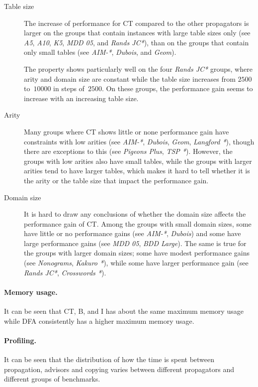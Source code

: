 \documentclass[a4paper,11pt]{article}
\numberwithin{equation}{section}
\begin{document}
\begin{description}
  \item[Table size] The increase
    of performance for CT compared to the other propagators
    is larger on the groups that contain 
    instances with large table sizes only (see \emph{A5}, \emph{A10},
    \emph{K5}, \emph{MDD 05}, and \emph{Rands JC*}), than on the groups
    that contain only small tables (see \emph{AIM-*}, \emph{Dubois}, and \emph{Geom}).
    
    The property shows particularly well on the four \emph{Rands JC*} groups, where
    arity and domain size are constant while the table size increases from
    $2500$ to~$10000$ in steps of~$2500$. On these groups, the performance gain
    seems to increase with an increasing table size.

    \item[Arity] Many groups where CT shows little or none performance gain have
      constraints with low arities (see \emph{AIM-*}, \emph{Dubois}, \emph{Geom},
      \emph{Langford *}), though there are exceptions to this (see \emph{Pigeons Plus},
      \emph{TSP *}). 
      However, the groups with low arities also have small tables, while the groups
      with larger arities tend to have larger tables, which makes it hard to
      tell whether it is the arity or the table size that impact the performance gain.
      
    \item[Domain size] It is hard to draw any conclusions of whether the domain size affects
      the performance gain of CT. Among the groups with small domain sizes, some
      have little or no performance gains (see \emph{AIM-*}, \emph{Dubois}) and
      some have large performance gains (see \emph{MDD 05}, \emph{BDD Large}).
      The same is true for the groups with larger domain sizes; some have
      modest performance gains (see \emph{Nonograms}, \emph{Kakuro *}),
      while some have larger performance gain (see \emph{Rands JC*}, \emph{Crosswords *}).
\end{description}

\paragraph{Memory usage.}
It can be seen that CT, B, and I has about the same maximum memory usage 
while DFA consistently has a higher maximum memory usage.
  
\paragraph{Profiling.}
It can be seen that the distribution of how the time is spent between propagation, advisors
and copying varies between different propagators and different groups of benchmarks.
\end{document}
